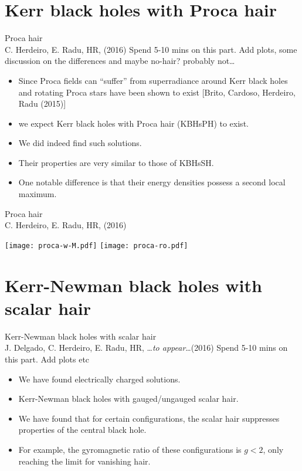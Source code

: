 \documentclass[xcolor=dvipsnames]{beamer}
\begin{document}
\section{Kerr black holes with Proca hair}
\begin{frame}{Proca hair \\\tiny{C. Herdeiro, E. Radu, HR, (2016)}}
  Spend 5-10 mins on this part. Add plots, some discussion on the differences and maybe no-hair? probably not\dots
  \begin{itemize}[<+->]
    \item Since Proca fields can ``suffer'' from superradiance around Kerr black holes and rotating Proca stars have been shown to exist \tiny{[Brito, Cardoso, Herdeiro, Radu (2015)]}
    \item we expect Kerr black holes with Proca hair (KBHsPH) to exist.
    \item We did indeed find such solutions.
    \item Their properties are very similar to those of KBHsSH.
    \item One notable difference is that their energy densities possess a second local maximum.
  \end{itemize}
\end{frame}

\begin{frame}{Proca hair \\\tiny{C. Herdeiro, E. Radu, HR, (2016)}}
  \begin{center}
    \texttt{[image: proca-w-M.pdf]}
    \texttt{[image: proca-ro.pdf]}
  \end{center}
\end{frame}

\section{Kerr-Newman black holes with scalar hair}
\begin{frame}{Kerr-Newman black holes with scalar hair \\ \tiny{J. Delgado, C. Herdeiro, E. Radu, HR, \ldots\textit{to appear}\ldots (2016)}}
  Spend 5-10 mins on this part. Add plots etc
  \begin{itemize}[<+->]
    \item We have found electrically charged solutions.
    \item Kerr-Newman black holes with gauged/ungauged scalar hair.
    \item We have found that for certain configurations, the scalar hair suppresses properties of the central black hole.
    \item For example, the gyromagnetic ratio of these configurations is $g<2$, only reaching the limit for vanishing hair.
  \end{itemize}
\end{frame}
\end{document}
